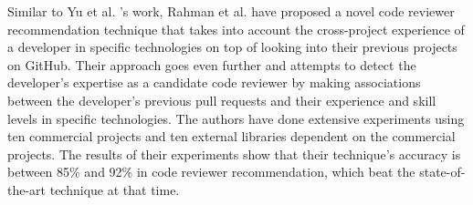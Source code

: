         Similar to Yu et al. \cite{yu2016reviewer}'s work, Rahman et al. \cite{rahman2016correct} have proposed a novel code reviewer recommendation technique that takes into account the cross-project experience of a developer in specific technologies on top of looking into their previous projects on GitHub. Their approach goes even further and attempts to detect the developer's expertise as a candidate code reviewer by making associations between the developer's previous pull requests and their experience and skill levels in specific technologies. The authors have done extensive experiments using ten commercial projects and ten external libraries dependent on the commercial projects. The results of their experiments show that their technique's accuracy is between 85\% and 92\% in code reviewer recommendation, which beat the state-of-the-art technique at that time.
        
